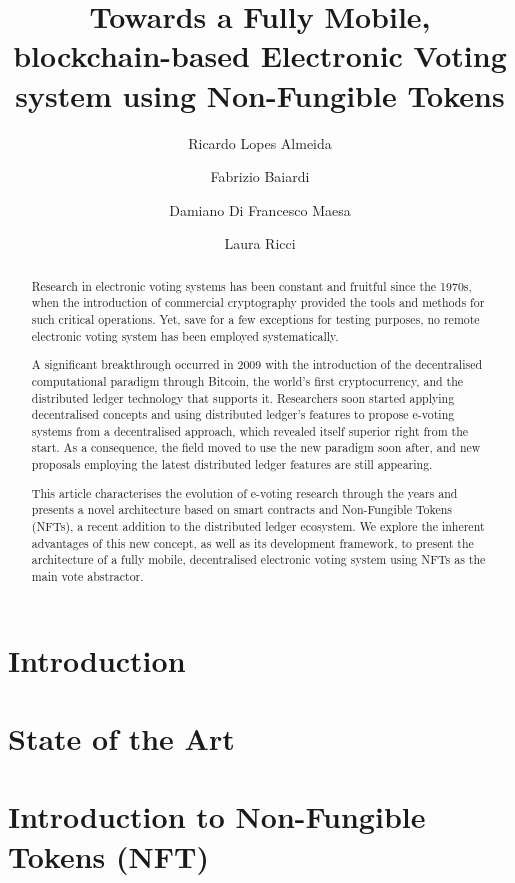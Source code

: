\documentclass[10pt]{article}
\author[1]{Ricardo Lopes Almeida}
\author[2]{Fabrizio Baiardi}
\author[3]{Damiano Di Francesco Maesa}
\author[4]{Laura Ricci}
\affil[1, 2, 3, 4]{Dipartimento di Informatica, Università di Pisa, Italia}
\affil[1]{Università di Camerino, Italia}
\title{Towards a Fully Mobile, blockchain-based Electronic Voting system using Non-Fungible Tokens}
\begin{document}
    \maketitle

    \begin{abstract}
    Research in electronic voting systems has been constant and fruitful since the 1970s, when the introduction of commercial cryptography provided the tools and methods for such critical operations. Yet, save for a few exceptions for testing purposes, no remote electronic voting system has been employed systematically.
    \par
    A significant breakthrough occurred in 2009 with the introduction of the decentralised computational paradigm through Bitcoin, the world's first cryptocurrency, and the distributed ledger technology that supports it. Researchers soon started applying decentralised concepts and using distributed ledger's features to propose e-voting systems from a decentralised approach, which revealed itself superior right from the start. As a consequence, the field moved to use the new paradigm soon after, and new proposals employing the latest distributed ledger features are still appearing.
    \par
    This article characterises the evolution of e-voting research through the years and presents a novel architecture based on smart contracts and Non-Fungible Tokens (NFTs), a recent addition to the distributed ledger ecosystem. We explore the inherent advantages of this new concept, as well as its development framework, to present the architecture of a fully mobile, decentralised electronic voting system using NFTs as the main vote abstractor.
    \end{abstract}


    
    \section{Introduction}
        \label{introduction}
        
    
    \section{State of the Art}
        \label{stateoftheart}
        
    
    \section{Introduction to Non-Fungible Tokens (NFT)}
        \label{introduction_nfts}
        
    
\end{document}
